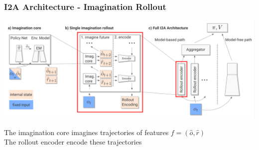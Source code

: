 \begin{frame}
    \frametitle{I2A Architecture - Imagination Rollout}


\includegraphics[width=\columnwidth]{./Images/i2a_all_imagination_rollout.png}%

\vspace{-10mm}
The imagination core imagines trajectories of features $f = (\hat{o}, \hat{r})$\\
The rollout encoder encode these trajectories    
\end{frame}
\clearpage


